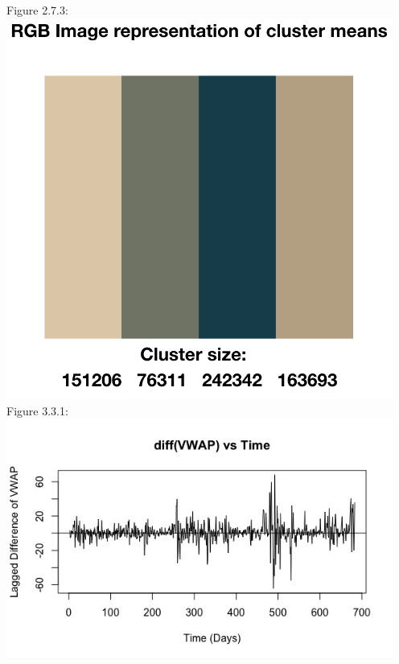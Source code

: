 \documentclass[12pt]{article}
\begin{document}
\begin{center}
  Figure 2.7.3:\\
  \includegraphics[width=5in]{plots/km_plot10.png}\\

  Figure 3.3.1:\\
  \includegraphics[width=5in]{plots/ts_plot1.jpeg}\\


\end{center}
\end{document}

